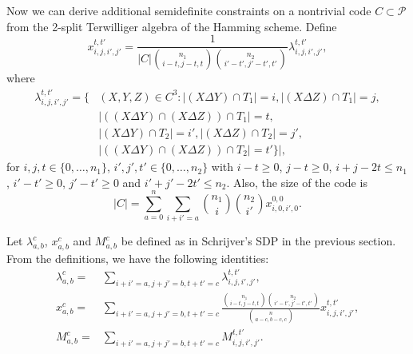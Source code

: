 \documentclass[final,onecolumn]{IEEEtran}
\theoremstyle{definition}
\newcommand{\cP}{{\mathcal P}}
\begin{document}
Now we can derive additional semidefinite constraints on a nontrivial code $C\subset \cP$ from the 2-split Terwilliger algebra of the Hamming scheme.
Define
\begin{equation}
	x_{i, j, i', j'}^{t, t'} = \frac{1}{\lvert C\rvert \binom{n_{1}}{i-t, j-t, t} \binom{n_{2}}{i'-t', j'-t', t'}} \lambda^{t, t'}_{i, j, i', j'},
\end{equation}
where
\begin{equation}
	\begin{aligned}
		\lambda^{t, t'}_{i, j, i', j'} = \{&(X, Y, Z) \in C^{3} : \lvert (X \Delta Y)\cap T_{1}\rvert = i, \lvert (X \Delta Z)\cap T_{1}\rvert = j, \\
		&\lvert((X \Delta Y)\cap (X \Delta Z))\cap T_{1}\rvert = t,\\
		&\lvert(X \Delta Y)\cap T_{2}\rvert = i', \lvert(X \Delta Z)\cap T_{2}\rvert = j',\\
		&\lvert((X \Delta Y)\cap (X \Delta Z))\cap T_{2}\rvert = t' \}\rvert,
	\end{aligned}
\end{equation}
for $i, j, t \in \{0, \dots, n_{1}\}$, $i', j', t' \in \{0, \dots, n_{2}\}$ with $i-t \geq 0$, $j-t \geq 0$, $i+j-2t \leq n_{1}$, $i'-t' \geq 0$, $j'-t' \geq 0$ and $i'+j'-2t' \leq n_{2}$. 
Also,  the size of the code is 
\begin{equation*}
	\lvert C \rvert=\sum_{a = 0}^{n} \sum_{i+i' = a} \binom{n_{1}}{i}\binom{n_{2}}{i'} x_{i, 0, i', 0}^{0, 0}.
\end{equation*}
	
Let $\lambda_{a, b}^{c}$, $x_{a, b}^{c}$ and $M_{a, b}^{c}$ be defined as in Schrijver's SDP in the previous section. From the definitions, we have the following identities:
\begin{align}
	\lambda_{a, b}^{c} =& \sum_{i+i' = a, j+j' = b, t+t' = c} \lambda_{i, j, i', j'}^{t, t'},   \label{eqn:id_1}\\
	x_{a, b}^{c} =& \sum_{i+i' = a, j+j' = b, t+t' =c} \frac{\binom{n_{1}}{i-t, j-t, t} \binom{n_{2}}{i'-t', j'-t', t'}}{\binom{n}{a-c, b-c, c}}x_{i, j, i', j'}^{t, t'},  \label{eqn:id_2}\\
	M_{a, b}^{c} =& \sum_{i+i' = a, j+j' = b, t+t' = c} M_{i, j, i', j'}^{t, t'}.  \label{eqn:id_3}
\end{align}
	
\end{document}
